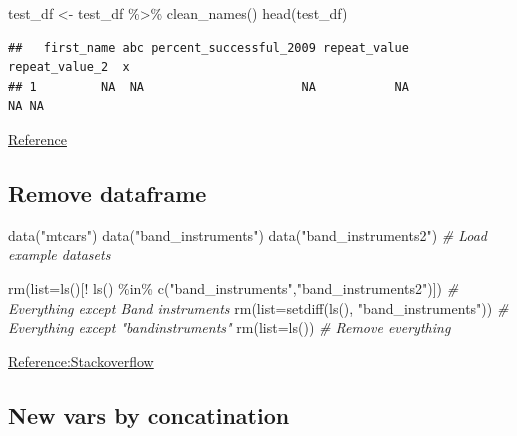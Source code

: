 \documentclass[
]{article}
\newenvironment{Shaded}{\begin{snugshade}}{\end{snugshade}}
\newcommand{\AttributeTok}[1]{\textcolor[rgb]{0.77,0.63,0.00}{#1}}
\newcommand{\CommentTok}[1]{\textcolor[rgb]{0.56,0.35,0.01}{\textit{#1}}}
\newcommand{\FunctionTok}[1]{\textcolor[rgb]{0.00,0.00,0.00}{#1}}
\newcommand{\NormalTok}[1]{#1}
\newcommand{\OtherTok}[1]{\textcolor[rgb]{0.56,0.35,0.01}{#1}}
\newcommand{\SpecialCharTok}[1]{\textcolor[rgb]{0.00,0.00,0.00}{#1}}
\newcommand{\StringTok}[1]{\textcolor[rgb]{0.31,0.60,0.02}{#1}}
\begin{document}
\begin{Shaded}
\begin{Highlighting}[]
\NormalTok{test\_df }\OtherTok{\textless{}{-}}\NormalTok{ test\_df }\SpecialCharTok{\%\textgreater{}\%}
  \FunctionTok{clean\_names}\NormalTok{()}
\FunctionTok{head}\NormalTok{(test\_df)}
\end{Highlighting}
\end{Shaded}

\begin{verbatim}
##   first_name abc percent_successful_2009 repeat_value repeat_value_2  x
## 1         NA  NA                      NA           NA             NA NA
\end{verbatim}

\href{https://cran.r-project.org/web/packages/janitor/vignettes/janitor.html}{Reference}

\hypertarget{remove-dataframe}{%
\subsection{Remove dataframe}\label{remove-dataframe}}

\begin{Shaded}
\begin{Highlighting}[]
\FunctionTok{data}\NormalTok{(}\StringTok{"mtcars"}\NormalTok{)}
\FunctionTok{data}\NormalTok{(}\StringTok{"band\_instruments"}\NormalTok{)}
\FunctionTok{data}\NormalTok{(}\StringTok{"band\_instruments2"}\NormalTok{) }\CommentTok{\# Load example datasets}

\FunctionTok{rm}\NormalTok{(}\AttributeTok{list=}\FunctionTok{ls}\NormalTok{()[}\SpecialCharTok{!} \FunctionTok{ls}\NormalTok{() }\SpecialCharTok{\%in\%} \FunctionTok{c}\NormalTok{(}\StringTok{"band\_instruments"}\NormalTok{,}\StringTok{"band\_instruments2"}\NormalTok{)]) }
\CommentTok{\# Everything except Band instruments}
\FunctionTok{rm}\NormalTok{(}\AttributeTok{list=}\FunctionTok{setdiff}\NormalTok{(}\FunctionTok{ls}\NormalTok{(), }\StringTok{"band\_instruments"}\NormalTok{)) }\CommentTok{\# Everything except "bandinstruments"}
\FunctionTok{rm}\NormalTok{(}\AttributeTok{list=}\FunctionTok{ls}\NormalTok{()) }\CommentTok{\# Remove everything}
\end{Highlighting}
\end{Shaded}

\href{https://stackoverflow.com/questions/6190051/how-can-i-remove-all-objects-but-one-from-the-workspace-in-r}{Reference:Stackoverflow}

\hypertarget{new-vars-by-concatination}{%
\subsection{New vars by concatination}\label{new-vars-by-concatination}}
\end{document}
